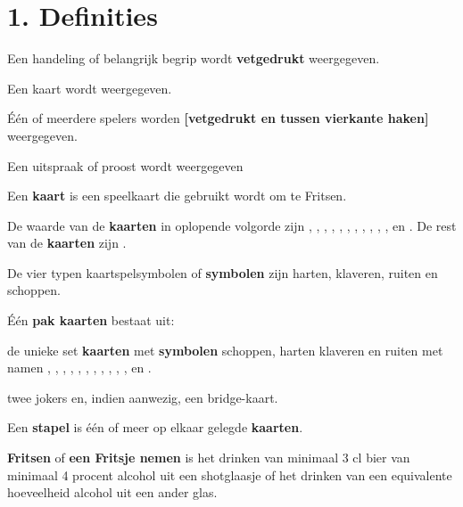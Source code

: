 \newpage
\drawBar{}

\vspace{-0.5cm}
\section*{1. Definities}

\item Een handeling of belangrijk begrip wordt \textbf{vetgedrukt} weergegeven.

\item Een kaart wordt  weergegeven.

\item Één of meerdere spelers worden \textbf{[vetgedrukt en tussen vierkante haken]} weergegeven.

\item Een uitspraak of proost wordt  weergegeven 

\item Een \textbf{kaart} is een speelkaart die gebruikt wordt om te Fritsen.

\item \label{item:kaarten_2} De waarde van de \textbf{kaarten} in oplopende volgorde zijn , , , , , , , , , , ,  en . De rest van de \textbf{kaarten} zijn .

\item De vier typen kaartspelsymbolen of \textbf{symbolen} zijn harten, klaveren, ruiten en schoppen. 

\item \label{item:kaarten} \'E\'en \textbf{pak kaarten} bestaat uit: 
    \puntLijst{}
        \item de unieke set \textbf{kaarten} met \textbf{symbolen} schoppen, harten klaveren en ruiten met namen , , , , , , , , , , ,  en .
        \item twee jokers en, indien aanwezig, een bridge-kaart.
    \eindPuntLijst{}

\item Een \textbf{stapel} is één of meer op elkaar gelegde \textbf{kaarten}.

\item \label{def:fritsen} \textbf{Fritsen} of \textbf{een Fritsje nemen} is het drinken van minimaal 3 cl bier van minimaal 4 procent alcohol uit een shotglaasje of het drinken van een equivalente hoeveelheid alcohol uit een ander glas.

